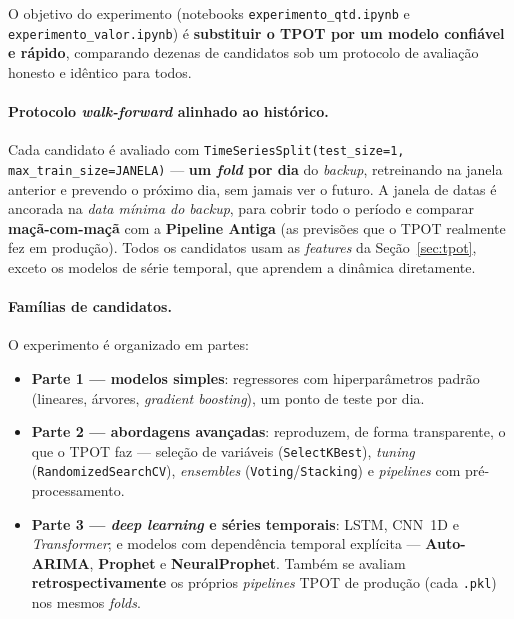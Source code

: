 \documentclass[11pt,a4paper]{article}
\begin{document}
O objetivo do experimento (notebooks \texttt{experimento\_qtd.ipynb} e
\texttt{experimento\_valor.ipynb}) é \textbf{substituir o TPOT por um modelo confiável e rápido},
comparando dezenas de candidatos sob um protocolo de avaliação honesto e idêntico para todos.

\paragraph{Protocolo \emph{walk-forward} alinhado ao histórico.} Cada candidato é avaliado com
\texttt{TimeSeriesSplit(test\_size=1, max\_train\_size=JANELA)} --- \textbf{um \emph{fold} por dia}
do \emph{backup}, retreinando na janela anterior e prevendo o próximo dia, sem jamais ver o futuro.
A janela de datas é ancorada na \emph{data mínima do backup}, para cobrir todo o período e comparar
\textbf{maçã-com-maçã} com a \textbf{Pipeline Antiga} (as previsões que o TPOT realmente fez em
produção). Todos os candidatos usam as \emph{features} da Seção~\ref{sec:tpot}, exceto os modelos
de série temporal, que aprendem a dinâmica diretamente.

\paragraph{Famílias de candidatos.} O experimento é organizado em partes:
\begin{itemize}\setlength\itemsep{1pt}
\item \textbf{Parte 1 --- modelos simples}: regressores com hiperparâmetros padrão (lineares,
árvores, \emph{gradient boosting}), um ponto de teste por dia.
\item \textbf{Parte 2 --- abordagens avançadas}: reproduzem, de forma transparente, o que o TPOT
faz --- seleção de variáveis (\texttt{SelectKBest}), \emph{tuning} (\texttt{RandomizedSearchCV}),
\emph{ensembles} (\texttt{Voting}/\texttt{Stacking}) e \emph{pipelines} com pré-processamento.
\item \textbf{Parte 3 --- \emph{deep learning} e séries temporais}: LSTM, CNN~1D e \emph{Transformer};
e modelos com dependência temporal explícita --- \textbf{Auto-ARIMA}, \textbf{Prophet} e
\textbf{NeuralProphet}. Também se avaliam \textbf{retrospectivamente} os próprios \emph{pipelines}
TPOT de produção (cada \texttt{.pkl}) nos mesmos \emph{folds}.
\end{itemize}
\end{document}
